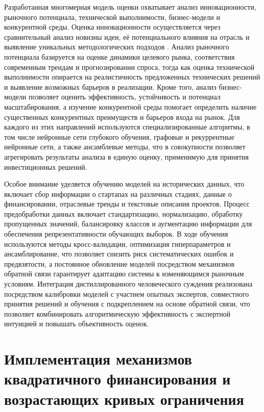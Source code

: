 \documentclass[
    candidate, %
    subf, %
    dotsinheaders=false,
]{disser}
\begin{document}
Разработанная многомерная модель оценки охватывает анализ инновационности, рыночного потенциала, технической выполнимости, бизнес-модели и конкурентной среды. Оценка инновационности осуществляется через сравнительный анализ новизны идеи, её потенциального влияния на отрасль и выявление уникальных методологических подходов \cite{stanley2015greatness}. Анализ рыночного потенциала базируется на оценке динамики целевого рынка, соответствия современным трендам и прогнозировании спроса, тогда как оценка технической выполнимости опирается на реалистичность предложенных технических решений и выявление возможных барьеров в реализации. Кроме того, анализ бизнес-модели позволяет оценить эффективность, устойчивость и потенциал масштабирования, а изучение конкурентной среды помогает определить наличие существенных конкурентных преимуществ и барьеров входа на рынок. Для каждого из этих направлений используются специализированные алгоритмы, в том числе нейронные сети глубокого обучения, графовые и рекуррентные нейронные сети, а также ансамблевые методы, что в совокупности позволяет агрегировать результаты анализа в единую оценку, применимую для принятия инвестиционных решений.

Особое внимание уделяется обучению моделей на исторических данных, что включает сбор информации о стартапах на различных стадиях, данные о финансировании, отраслевые тренды и текстовые описания проектов. Процесс предобработки данных включает стандартизацию, нормализацию, обработку пропущенных значений, балансировку классов и аугментацию информации для обеспечения репрезентативности обучающих выборок. В ходе обучения используются методы кросс-валидации, оптимизация гиперпараметров и ансамблирование, что позволяет снизить риск систематических ошибок и предвзятости, а постоянное обновление моделей посредством механизмов обратной связи гарантирует адаптацию системы к изменяющимся рыночным условиям. Интеграция дистиллированного человеческого суждения реализована посредством калибровки моделей с участием опытных экспертов, совместного принятия решений и обучения с подкреплением на основе обратной связи, что позволяет комбинировать алгоритмическую эффективность с экспертной интуицией и повышать объективность оценок.

\section{Имплементация механизмов квадратичного финансирования и возрастающих кривых ограничения}
\end{document}
